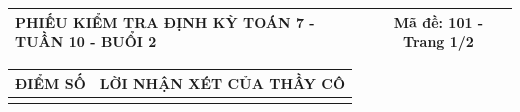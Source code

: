 \documentclass[12pt,a4paper]{article}
\begin{document}
\pagestyle{empty}
\noindent
\begin{tabularx}{\linewidth}{|X|c|}
\hline
\textbf{PHIẾU KIỂM TRA ĐỊNH KỲ TOÁN 7 - TUẦN 10 - BUỔI 2} & \textbf{Mã đề: 101 - Trang 1/2} \\
\hline
\end{tabularx}

\vspace{1.2mm}

\noindent
\begin{tabularx}{\linewidth}{|p{3.2cm}|X|}
\hline
\centering\textbf{ĐIỂM SỐ} & \centering\textbf{LỜI NHẬN XÉT CỦA THẦY CÔ} \tabularnewline
\hline
\rule{0pt}{1.8cm} & \tabularnewline
\hline
\end{tabularx}
\end{document}
